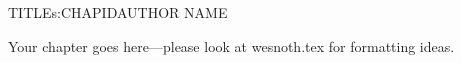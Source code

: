 \begin{aosachapter}{TITLE}{s:CHAPID}{AUTHOR NAME}

Your chapter goes here---please look at wesnoth.tex for formatting ideas.

\end{aosachapter}
